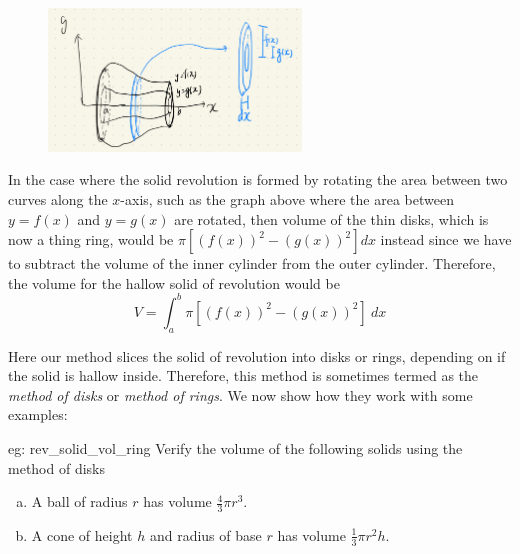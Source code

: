 \begin{figure}[ht]
    \centering
    \includegraphics[width = 0.6\textwidth]{figures/chap 07/revolution_vol_ring.png}
\end{figure}

In the case where the solid revolution is formed by rotating the area between two curves along the $x$-axis, such as the graph above where the area between $y=f(x)$ and $y=g(x)$ are rotated, then volume of the thin disks, which is now a thing ring, would be $\pi [(f(x))^2-(g(x))^2] dx$ instead since we have to subtract the volume of the inner cylinder from the outer cylinder.  Therefore, the volume for the hallow solid of revolution would be 
\[V = \int_a^b \pi [(f(x))^2-(g(x))^2]~dx\]

Here our method slices the solid of revolution into disks or rings, depending on if the solid is hallow inside.  Therefore, this method is sometimes termed as the \textit{method of disks} or \textit{method of rings}.  We now show how they work with some examples:

\begin{eg}[]{eg: rev_solid_vol_ring}
    Verify the volume of the following solids using the method of disks
    \begin{enumerate}[a)]
        \item A ball of radius $r$ has volume $\frac{4}{3}\pi r^3$.
        \item A cone of height $h$ and radius of base $r$ has volume $\frac{1}{3}\pi r^2 h$.
    \end{enumerate}
\end{eg}

